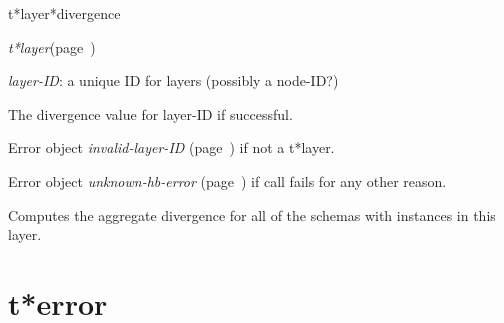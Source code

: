 \begin{description}
\item [Name:]  t*layer*divergence

\item [Class:] {\sl t*layer}\hfill(page~\pageref{t*layer})

\item [Parameters:]
\item {\sl layer-ID}:  a unique ID for layers (possibly a node-ID?)



\item [Return-value:]
The divergence value for layer-ID if successful.

Error object {\sl invalid-layer-ID} (page~\pageref{invalid-layer-ID}) if not a t*layer.

Error object {\sl unknown-hb-error} (page~\pageref{unknown-hb-error}) if call fails
for any other reason.

\item [Description:]

Computes the aggregate divergence for all of the
schemas with instances in this layer. 

\item [Public:]



\end{description}
\horizontalline

\section{t*error}
\label{t*error}

